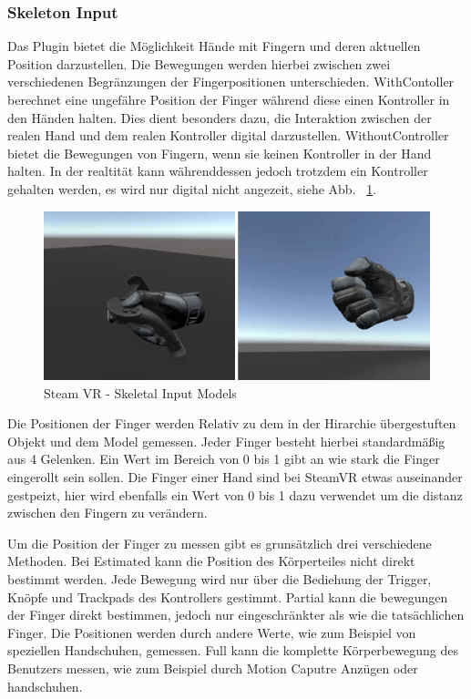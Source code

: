 \begin{itemize}
\subsubsection{Skeleton Input}
Das Plugin bietet die Möglichkeit Hände mit Fingern und deren aktuellen Position darzustellen.
Die Bewegungen werden hierbei zwischen zwei verschiedenen Begränzungen der Fingerpositionen unterschieden.
WithContoller berechnet eine ungefähre Position der Finger während diese einen Kontroller in den Händen halten.
Dies dient besonders dazu, die Interaktion zwischen der realen Hand und dem realen Kontroller digital darzustellen.
WithoutController bietet die Bewegungen von Fingern, wenn sie keinen Kontroller in der Hand halten.
In der realtität kann währenddessen jedoch trotzdem ein Kontroller gehalten werden, es wird nur digital nicht angezeit, siehe Abb. ~\ref{fig:steamvr_skeletal_input_models}.
\begin {figure}
    \centering
    \includegraphics[scale=1]{pics/steamVR_skeletal_input_models}
    \caption{Steam VR - Skeletal Input Models}
    \label{fig:steamvr_skeletal_input_models}
\end {figure}
Die Positionen der Finger werden Relativ zu dem in der Hirarchie übergestuften Objekt und dem Model gemessen.
Jeder Finger besteht hierbei standardmäßig aus 4 Gelenken.
Ein Wert im Bereich von 0 bis 1 gibt an wie stark die Finger eingerollt sein sollen.
Die Finger einer Hand sind bei SteamVR etwas auseinander gestpeizt, hier wird ebenfalls ein Wert von 0 bis 1 dazu verwendet um die distanz zwischen den Fingern zu verändern.

Um die Position der Finger zu messen gibt es grunsätzlich drei verschiedene Methoden.
Bei Estimated kann die Position des Körperteiles nicht direkt bestimmt werden.
Jede Bewegung wird nur über die Bediehung der Trigger, Knöpfe und Trackpads des Kontrollers gestimmt.
Partial kann die bewegungen der Finger direkt bestimmen, jedoch nur eingeschränkter als wie die tatsächlichen Finger.
Die Positionen werden durch andere Werte, wie zum Beispiel von speziellen Handschuhen, gemessen.
Full kann die komplette Körperbewegung des Benutzers messen, wie zum Beispiel durch Motion Caputre Anzügen oder handschuhen.


\end{itemize}
